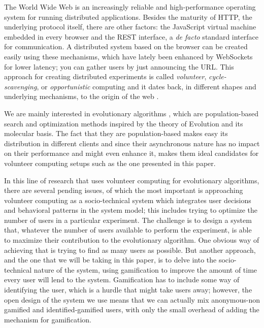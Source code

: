 \documentclass{llncs}
\begin{document}
The World Wide Web is an increasingly reliable and high-performance
operating system for running distributed applications. Besides the
maturity of HTTP, the underlying protocol itself, there are other
factors: the JavaScript virtual machine embedded in every browser
and the REST interface, a {\em de facto} standard interface for
communication. A distributed system based on the browser can be
created easily using these mechanisms, which have lately been enhanced
by WebSockets for lower latency; you can gather users by just
announcing the URL. This approach for creating distributed experiments is called {\em
  volunteer}, {\em cycle-scavenging}, or {\em opportunistic} computing
\cite{sarmenta2001volunteer} and it dates back, in different shapes
and underlying mechanisms, to the origin of the web
\cite{david-seti:home}. 

We are mainly interested in evolutionary algorithms \cite{jj-ppsn98},
which are population-based search and optimization methods inspired by
the theory of Evolution and its molecular basis. The fact that they
are population-based makes easy its distribution in different clients
and since their asynchronous nature has no impact on their performance
and might even enhance it, makes them ideal candidates for volunteer
computing setups such as the one presented in this paper. 

In this line of research that uses volunteer computing for
evolutionary algorithms, there are several pending issues, of which
the most important is approaching volunteer computing as a 
socio-technical system \cite{vespignani2009predicting} which integrates
user decisions and behavioral patterns in the system model; this
includes trying to optimize the number of users in a particular
experiment. The challenge is to design a system that, whatever the
number of users available to perform the experiment, is able to
maximize their contribution to the evolutionary algorithm. One obvious
way of achieving that is trying to find as many users as possible. But
another approach, and the one that we will be taking in this paper, is
to delve into the socio-technical nature of the system, using
gamification to improve the amount of time every user will lend to the
system. Gamification has to include some way of identifying the user,
which is a hurdle that might take users away; however, the open design
of the system we use means that we can actually mix anonymous-non
gamified and identified-gamified users, with only the small overhead
of adding the mechanism for gamification. 
\end{document}
